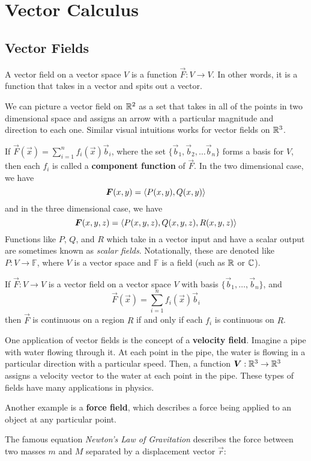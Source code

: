 \section{Vector Calculus}
\subsection{Vector Fields}
A vector field on a vector space $V$ is a function $\vec F: V\to V$. In other words, it is a function that takes in a vector and spits out a vector. \par
We can picture a vector field on $\mathbb{R}^2$ as a set that takes in all of the points in two dimensional space and assigns an arrow with a particular magnitude and direction to each one. Similar visual intuitions works for vector fields on $\mathbb{R}^3$. \par
If $\vec F(\vec x) = \sum_{i=1}^n f_i(\vec x)\vec b_i$, where the set $\{\vec b_1, \vec b_2, \dots \vec b_n \}$ forms a basis for $V$, then each $f_i$ is called a \textbf{component function} of $\vec F$. In the two dimensional case, we have
\[ \boldsymbol{F}(x,y) = \left\langle P(x,y), Q(x,y) \right\rangle \]
and in the three dimensional case, we have
\[ \boldsymbol{F}(x,y,z) = \left\langle P(x,y,z), Q(x,y,z), R(x,y,z) \right\rangle \]
Functions like $P$, $Q$, and $R$ which take in a vector input and have a scalar output are sometimes known as \textit{scalar fields}. Notationally, these are denoted like $P: V\to \mathbb{F}$, where $V$ is a vector space and $\mathbb{F}$ is a field (such as $\mathbb{R}$ or $\mathbb{C}$). 
\begin{definition}
    If $\vec F: V\to V$ is a vector field on a vector space $V$ with basis $\{\vec b_1, \dots, \vec b_n\}$, and
    \[ \vec F(\vec x) = \sum_{i=1}^{n}f_i(\vec x)\vec b_i \]
    then $\vec F$ is continuous on a region $R$ if and only if each $f_i$ is continuous on $R$.
\end{definition}
One application of vector fields is the concept of a \textbf{velocity field}. Imagine a pipe with water flowing through it. At each point in the pipe, the water is flowing in a particular direction with a particular speed. Then, a function $\boldsymbol{V}: \mathbb{R}^3\to \mathbb{R}^3$ assigns a velocity vector to the water at each point in the pipe. These types of fields have many applications in physics. \par
Another example is a \textbf{force field}, which describes a force being applied to an object at any particular point. \par
The famous equation \textit{Newton's Law of Gravitation} describes the force between two masses $m$ and $M$ separated by a displacement vector $\vec r$:
